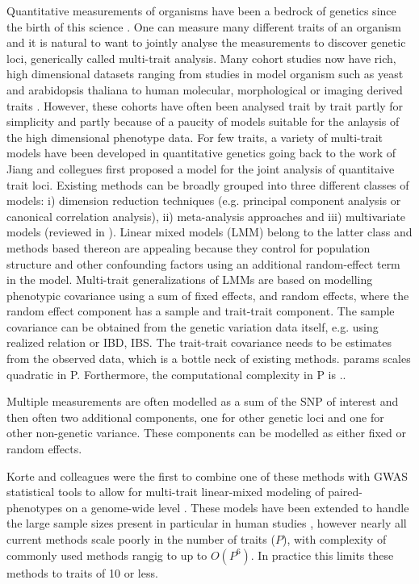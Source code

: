 Quantitative measurements of organisms have been a bedrock of genetics since the birth of this science \citep{FisherWheat}. One can measure many different traits of an organism and it is natural to want to jointly analyse the measurements to discover genetic loci, generically called multi-trait analysis. Many cohort studies now have rich, high dimensional datasets ranging from studies in model organism such as yeast and arabidopsis thaliana to human molecular, morphological or imaging derived traits \citep{Bloom2013,Atwell2010,Astle2009,Shaffer2016,Stein2010}. However, these cohorts have often been analysed trait by trait partly for simplicity and partly because of a paucity of models suitable for the anlaysis of the high dimensional phenotype data. For few traits, a variety of multi-trait models have been developed in quantitative genetics going back to the work of Jiang and collegues \citeyearpar{Jiang1995} first proposed a model for the joint analysis of quantitaive trait loci. Existing methods can be broadly grouped into three different classes of models: i) dimension reduction techniques (e.g. principal component analysis or canonical correlation analysis), ii) meta-analysis approaches and iii) multivariate models (reviewed in \citep{Shriner2012}). Linear mixed models (LMM) belong to the latter class and methods based thereon are appealing because they control for population structure and other confounding factors using an additional random-effect term in the model. Multi-trait generalizations of LMMs are based on modelling phenotypic covariance using a sum of fixed effects, and random effects, where the random effect component has a sample and trait-trait component. 
The sample covariance can be obtained from the genetic variation data itself, e.g. using realized relation or IBD, IBS. The trait-trait covariance needs to be estimates from the observed data, which is a bottle neck of existing methods. params scales quadratic in P. Forthermore, the computational complexity in P is .. 



Multiple measurements are often modelled as a sum of the SNP of interest and then often two additional components, one for other genetic loci and one for other non-genetic variance. These components can be modelled as either fixed or random effects. 

 Korte and colleagues were the first to combine one of these methods with GWAS statistical tools to allow for multi-trait linear-mixed modeling of paired-phenotypes on a genome-wide level \citeyearpar{Korte2012}. These models have been extended to handle the large sample sizes present in particular in human studies \citep{Zhou2014,Casale2015}, however nearly all current methods scale poorly in the number of  traits ($P$), with complexity of commonly used methods rangig to up to \(O(P^6)\). In practice this limits these methods to traits of 10 or less. 

